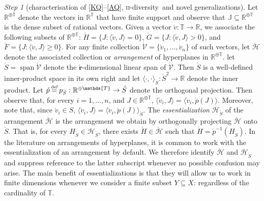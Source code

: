 \documentclass[ecta,nameyear,draft]{econsocart}
\newcommand{\R}{\mathbb R}
\newcommand{\mc}{\mathcal}
\newcommand\defeq{\mathrel{\overset{\makebox[0pt]{\mbox{\normalfont\tiny def}}}{=}}}%
\newcommand{\spann}{\operatorname{span}}
\newcommand{\mbbtpp}{{\mathds{T}}}
\newcommand{\mbbjpp}{\mathds{J}}
\newcommand{\twodiv}{\textsc{ii}-\textup{diversity}}
\theoremstyle{plain}
\theoremstyle{remark}
\newtheorem{step}{Step}[section]
\begin{document}
\begin{appendix}
\begin{step}[characterisation of \ref{KQ}–\ref{AQ}, \twodiv\ and novel
      generalizations]
    Let $\R^{\oplus\mbbtpp}$ denote the vectors in $\R^{\mbbtpp}$ that have
    finite support and observe that $\mbbjpp \subseteq \R^{\oplus\mbbtpp}$ is the
    dense subset of rational vectors.  Given a vector $\acute{v}: \mbbtpp
    \rightarrow \R$, we associate the following subsets of $\R^{\oplus\mbbtpp}$:
    $\acute H = \{J : \langle \acute v , J \rangle = 0 \}$, $\acute G = \{J :
    \langle \acute v, J \rangle > 0\}$, and $\acute F = \{J : \langle \acute v,
    J \rangle \geq 0\}$. For any finite collection $\acute{\mc V} = \{\acute{v}_1,
    \dots, \acute{v}_n\}$ of such vectors, let $\acute{\mc H}$ denote the
    associated collection or \emph{arrangement} of hyperplanes in
    $\R^{\oplus\mbbtpp}$. let $\acute{S} = \spann \acute{\mc V}$ denote the
    $\acute{\mathbf{r}}$-dimensional linear span of $\acute{\mc V}$. Then
    $\acute S$ is a well-defined inner-product space in its own right and let
    $\langle \cdot , \cdot \rangle_{\acute{S}}: \acute{S}^2 \rightarrow \R$ denote
    the inner product. Let $\acute{p} \defeq p_{\acute{S}}: \R^{\oplus\mbbtpp}
    \rightarrow \acute{S}$ denote the orthogonal projection. Then observe that,
    for every $i = 1, \dots,
    n$, and $J \in \R^{\oplus\mbbtpp}$, $\langle \acute{v}_i, J \rangle = \langle
    \acute{v}_i, \acute{p}(J)\rangle$. Moreover, note that, since $\acute{v}_i \in
    S$, $\langle \acute{v}_i, J \rangle = \langle \acute{v}_i, \acute{p}(J)
    \rangle_{\acute{S}}$.  The \emph{essentialization} ${\mc H}_{\acute{S}}$ of
    the arrangement $\acute{\mc H}$ is the arrangement we obtain by orthogonally
    projecting $\acute{\mc H}$ onto $\acute{S}$.  That is, for every $H_{\acute{S}}
    \in {\mc H}_{\acute{S}}$, there exists $\acute{H} \in \acute{\mc H}$ such that
    $\acute{H} = \acute{p}^{-1}(H_{\acute{S}})$.  In the literature on
    arrangements of hyperplanes, it is common to work with the essentialization
    of an arrangement by default.  We therefore identify $\acute{\mc H}$ and
    $\mc{H}_{\acute{S}}$ and suppress reference to the latter subscript
    whenever no possible confusion may arise. The main benefit of
    essentializations is that they will allow us to work in finite dimensions
    whenever we consider a finite subset $Y\subseteq X$: regardless of the
    cardinality of $\mbbtpp$.

\end{step}
\end{appendix}
\end{document}
